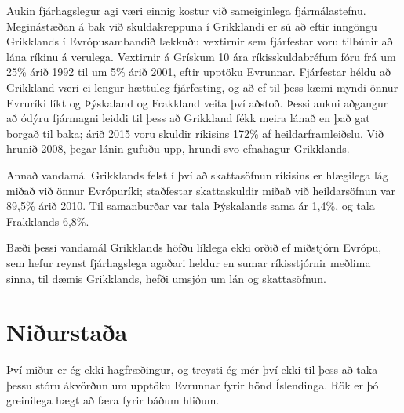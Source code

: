 \documentclass[a4paper]{article}
\begin{document}
Aukin fjárhagslegur agi væri einnig kostur við sameiginlega fjármálastefnu. Meginástæðan á bak við skuldakreppuna í Grikklandi er sú að eftir inngöngu Grikklands í Evrópusambandið lækkuðu vextirnir sem fjárfestar voru tilbúnir að lána ríkinu á verulega. Vextirnir á Grískum 10 ára ríkisskuldabréfum fóru frá um 25\% árið 1992 til um 5\% árið 2001, eftir upptöku Evrunnar. Fjárfestar héldu að Grikkland væri ei lengur hættuleg fjárfesting, og að ef til þess kæmi myndi önnur Evruríki líkt og Þýskaland og Frakkland veita því aðstoð. Þessi aukni aðgangur að ódýru fjármagni leiddi til þess að Grikkland fékk meira lánað en það gat borgað til baka; árið 2015 voru skuldir ríkisins 172\% af heildarframleiðslu. Við hrunið 2008, þegar lánin gufuðu upp, hrundi svo efnahagur Grikklands.\cite{vox_greece}

Annað vandamál Grikklands felst í því að skattasöfnun ríkisins er hlægilega lág miðað við önnur Evrópuríki; staðfestar skattaskuldir miðað við heildarsöfnun var 89,5\% árið 2010. Til samanburðar var tala Þýskalands sama ár 1,4\%, og tala Frakklands 6,8\%.\cite{oecd_greece_taxes}

Bæði þessi vandamál Grikklands höfðu líklega ekki orðið ef miðstjórn Evrópu, sem hefur reynst fjárhagslega agaðari heldur en sumar ríkisstjórnir meðlima sinna, til dæmis Grikklands, hefði umsjón um lán og skattasöfnun.

\section{Niðurstaða}

Því miður er ég ekki hagfræðingur, og treysti ég mér því ekki til þess að taka þessu stóru ákvörðun um upptöku Evrunnar fyrir hönd Íslendinga. Rök er þó greinilega hægt að færa fyrir báðum hliðum.

\newpage


\end{document}

